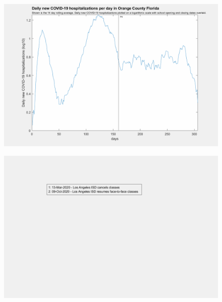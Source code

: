 \documentclass[]{article}
\begin{document}
\begin{figure}[!h]
	\includegraphics[width=\linewidth]{images/orange_hospitalizations_school_log.png}
	\caption{}
	\label{fig:images/orange_hospitalizations_school_logLabel}
\end{figure}

\begin{figure}[!h]
	\includegraphics[width=\linewidth]{legends/los_angeles_school_legend.png}
	\caption{}
	\label{fig:legends/los_angeles_school_legendLabel}
\end{figure}
\end{document}
